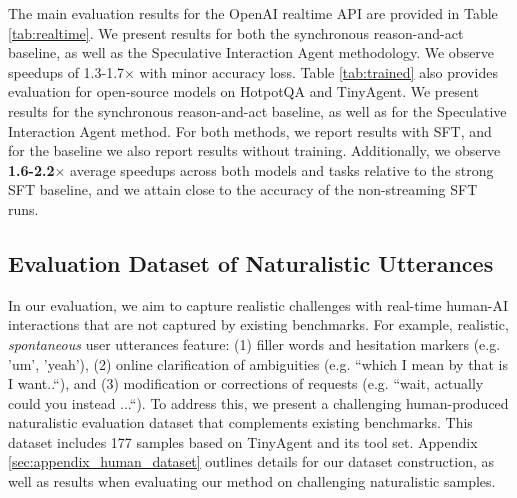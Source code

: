 The main evaluation results for the OpenAI realtime API are provided in Table \ref{tab:realtime}.
We present results for both the synchronous reason-and-act baseline, as well as the Speculative Interaction Agent methodology.
We observe speedups of 1.3-1.7$\times$ with minor accuracy loss.
Table \ref{tab:trained} also provides evaluation for open-source models on HotpotQA and TinyAgent.
We present results for the synchronous reason-and-act baseline, as well as for the Speculative Interaction Agent method.
For both methods, we report results with SFT, and for the baseline we also report results without training.
Additionally, we observe \textbf{1.6-2.2}$\times$ average speedups across both models and tasks relative to the strong SFT baseline, and we attain close to the accuracy of the non-streaming SFT runs.

\subsection{Evaluation Dataset of Naturalistic Utterances}

In our evaluation, we aim to capture realistic challenges with real-time human-AI interactions that are not captured by existing benchmarks. 
For example, realistic, \emph{spontaneous} user utterances feature: (1) filler words and hesitation markers (e.g. 'um', 'yeah'), (2) online clarification of ambiguities (e.g. ``which I mean by that is I want..``), and (3) modification or corrections of requests (e.g. ``wait, actually could you instead ...``). 
To address this, we present a challenging human-produced naturalistic evaluation dataset that complements existing benchmarks.
This dataset includes 177 samples based on TinyAgent and its tool set.
Appendix \ref{sec:appendix_human_dataset} outlines details for our dataset construction, as well as results when evaluating our method on challenging naturalistic samples.